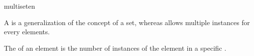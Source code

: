 \begin{modnl}[creators=Jinbo]{multiset}{en}

\begin{definition}[id=multiset.def]
	A  is a generalization of the concept of a set, whereas
 allows multiple instances for every elements. 
\end{definition}

\begin{definition}
	The  of an element is the number of instances 
of the element in a specific .
\end{definition}

\end{modnl}
